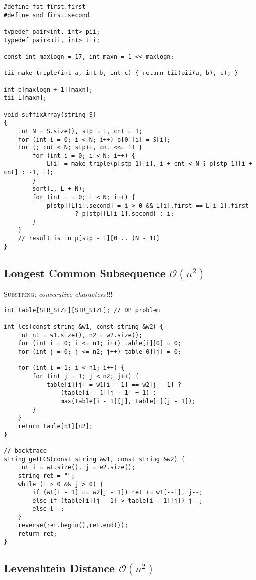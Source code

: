 \documentclass{article}
\begin{document}
\begin{lstlisting}
#define fst first.first
#define snd first.second

typedef pair<int, int> pii;
typedef pair<pii, int> tii;

const int maxlogn = 17, int maxn = 1 << maxlogn;

tii make_triple(int a, int b, int c) { return tii(pii(a, b), c); }

int p[maxlogn + 1][maxn];
tii L[maxn];

void suffixArray(string S)
{
    int N = S.size(), stp = 1, cnt = 1;
    for (int i = 0; i < N; i++) p[0][i] = S[i];
    for (; cnt < N; stp++, cnt <<= 1) {
        for (int i = 0; i < N; i++) {
            L[i] = make_triple(p[stp-1][i], i + cnt < N ? p[stp-1][i + cnt] : -1, i);
        }
        sort(L, L + N);
        for (int i = 0; i < N; i++) {
            p[stp][L[i].second] = i > 0 && L[i].first == L[i-1].first
		            ? p[stp][L[i-1].second] : i;
        }
    }
    // result is in p[stp - 1][0 .. (N - 1)]
}
\end{lstlisting}

\subsection{Longest Common Subsequence $\mathcal{O}(n^{2})$}
\textsc{Substring}: \textit{consecutive characters}\,!!!

\begin{lstlisting}
int table[STR_SIZE][STR_SIZE]; // DP problem

int lcs(const string &w1, const string &w2) {
	int n1 = w1.size(), n2 = w2.size();
	for (int i = 0; i <= n1; i++) table[i][0] = 0;
	for (int j = 0; j <= n2; j++) table[0][j] = 0;
	
	for (int i = 1; i < n1; i++) {
		for (int j = 1; j < n2; j++) {
			table[i][j] = w1[i - 1] == w2[j - 1] ? 
				(table[i - 1][j - 1] + 1) :
				max(table[i - 1][j], table[i][j - 1]);
		}
	}
	return table[n1][n2];
}

// backtrace
string getLCS(const string &w1, const string &w2) {
	int i = w1.size(), j = w2.size();
	string ret = "";
	while (i > 0 && j > 0) {
		if (w1[i - 1] == w2[j - 1]) ret += w1[--i], j--;
		else if (table[i][j - 1] > table[i - 1][j]) j--;
		else i--;
	}
	reverse(ret.begin(),ret.end());
	return ret;
}
\end{lstlisting}

\subsection{Levenshtein Distance $\mathcal{O}(n^{2})$}
\end{document}
